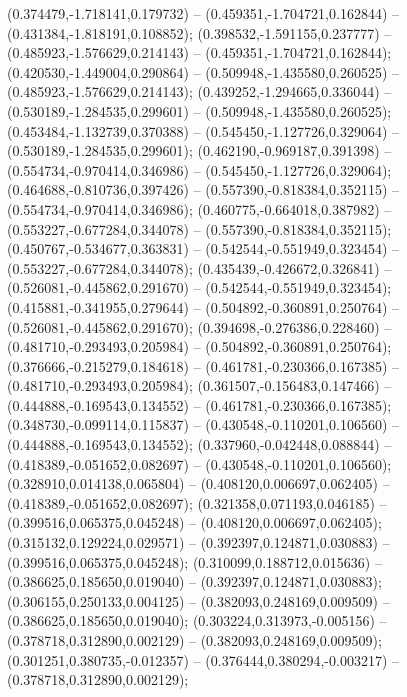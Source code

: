  (0.374479,-1.718141,0.179732) -- (0.459351,-1.704721,0.162844) -- (0.431384,-1.818191,0.108852);
 (0.398532,-1.591155,0.237777) -- (0.485923,-1.576629,0.214143) -- (0.459351,-1.704721,0.162844);
 (0.420530,-1.449004,0.290864) -- (0.509948,-1.435580,0.260525) -- (0.485923,-1.576629,0.214143);
 (0.439252,-1.294665,0.336044) -- (0.530189,-1.284535,0.299601) -- (0.509948,-1.435580,0.260525);
 (0.453484,-1.132739,0.370388) -- (0.545450,-1.127726,0.329064) -- (0.530189,-1.284535,0.299601);
 (0.462190,-0.969187,0.391398) -- (0.554734,-0.970414,0.346986) -- (0.545450,-1.127726,0.329064);
 (0.464688,-0.810736,0.397426) -- (0.557390,-0.818384,0.352115) -- (0.554734,-0.970414,0.346986);
 (0.460775,-0.664018,0.387982) -- (0.553227,-0.677284,0.344078) -- (0.557390,-0.818384,0.352115);
 (0.450767,-0.534677,0.363831) -- (0.542544,-0.551949,0.323454) -- (0.553227,-0.677284,0.344078);
 (0.435439,-0.426672,0.326841) -- (0.526081,-0.445862,0.291670) -- (0.542544,-0.551949,0.323454);
 (0.415881,-0.341955,0.279644) -- (0.504892,-0.360891,0.250764) -- (0.526081,-0.445862,0.291670);
 (0.394698,-0.276386,0.228460) -- (0.481710,-0.293493,0.205984) -- (0.504892,-0.360891,0.250764);
 (0.376666,-0.215279,0.184618) -- (0.461781,-0.230366,0.167385) -- (0.481710,-0.293493,0.205984);
 (0.361507,-0.156483,0.147466) -- (0.444888,-0.169543,0.134552) -- (0.461781,-0.230366,0.167385);
 (0.348730,-0.099114,0.115837) -- (0.430548,-0.110201,0.106560) -- (0.444888,-0.169543,0.134552);
 (0.337960,-0.042448,0.088844) -- (0.418389,-0.051652,0.082697) -- (0.430548,-0.110201,0.106560);
 (0.328910,0.014138,0.065804) -- (0.408120,0.006697,0.062405) -- (0.418389,-0.051652,0.082697);
 (0.321358,0.071193,0.046185) -- (0.399516,0.065375,0.045248) -- (0.408120,0.006697,0.062405);
 (0.315132,0.129224,0.029571) -- (0.392397,0.124871,0.030883) -- (0.399516,0.065375,0.045248);
 (0.310099,0.188712,0.015636) -- (0.386625,0.185650,0.019040) -- (0.392397,0.124871,0.030883);
 (0.306155,0.250133,0.004125) -- (0.382093,0.248169,0.009509) -- (0.386625,0.185650,0.019040);
 (0.303224,0.313973,-0.005156) -- (0.378718,0.312890,0.002129) -- (0.382093,0.248169,0.009509);
 (0.301251,0.380735,-0.012357) -- (0.376444,0.380294,-0.003217) -- (0.378718,0.312890,0.002129);
